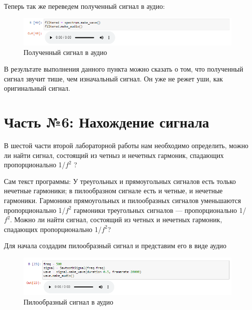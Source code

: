 \documentclass[a4paper]{article}
\begin{document}
           Теперь так же переведем полученный сигнал в аудио:
           
            \begin{figure}[H]
                \centering
                \includegraphics[width=\textwidth]{ex_5_result_signal_audio.png}
                \caption{Полученный сигнал в аудио}
                \label{fig:ex_5_result_signal_audio}
            \end{figure}
           
           В результате выполнения данного пункта можно сказать о том, что полученный сигнал звучит тише, чем изначальный сигнал. Он уже не режет уши, как оригинальный сигнал.
           
    \newpage
        \section{Часть №6: Нахождение сигнала}   
            В шестой части второй лабораторной работы нам необходимо определить, можно ли найти сигнал, состоящий из четныз и нечетных гармоник, спадающих пропорционально 1/$f^2$ ?
            
            Сам текст программы:
            У треугольных и прямоугольных сигналов есть только нечетные гармоники; в пилообразном сигнале есть и четные, и нечетные гармоники. Гармоники прямоугольных и пилообразных сигналов уменьшаются пропорционально 1/$f^2$ гармоники треугольных сигналов — пропорционально 1/$f^2$. Можно ли найти сигнал, состоящий из четных и нечетных гармоник, спадающих пропорционально 1/$f^2$?
            
            Для начала  создадим пилообразный сигнал и представим его в виде аудио
            
             \begin{figure}[H]
                \centering
                \includegraphics[width=\textwidth]{ex_6_sawtooth_signal_audio.png}
                \caption{Пилообразный сигнал в аудио}
                \label{fig:ex_6_sawtooth_signal_audio}
            \end{figure}
            
\end{document}
